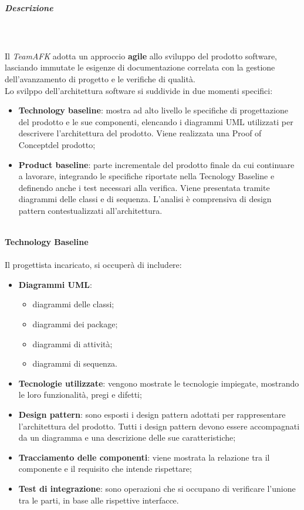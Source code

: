 		\subparagraph{Descrizione} \mbox{} \\ \mbox{} \\
		Il \textit{TeamAFK} adotta un approccio \textbf{agile} allo sviluppo del prodotto software, lasciando immutate le esigenze di documentazione correlata con la gestione dell'avanzamento di progetto e le verifiche di qualità. \\
		Lo svilppo dell'architettura software si suddivide in due momenti specifici:
			\begin{itemize}
				\item \textbf{Technology baseline}: mostra ad alto livello le specifiche di progettazione del prodotto e le sue componenti, elencando i diagrammi UML utilizzati per descrivere l'architettura del prodotto. Viene realizzata una Proof of Concept\glo del prodotto;
				\item \textbf{Product baseline}: parte incrementale del prodotto finale da cui continuare a lavorare, integrando le specifiche riportate nella Tecnology Baseline e definendo anche i test necessari alla verifica. Viene presentata tramite diagrammi delle classi e di sequenza. L'analisi è comprensiva di design pattern contestualizzati all'architettura.
			\end{itemize} 
			\mbox{} \\
			\textbf{Technology Baseline} \mbox{} \\ \mbox{} \\
			Il progettista incaricato, si occuperà di includere:
			\begin{itemize}
				\item \textbf{Diagrammi UML}:
				\begin{itemize}
					\item diagrammi delle classi;
					\item diagrammi dei package;
					\item diagrammi di attività;
					\item diagrammi di sequenza.
				\end{itemize}
				\item \textbf{Tecnologie utilizzate}: vengono mostrate le tecnologie impiegate, mostrando le loro funzionalità, pregi e difetti;
				\item \textbf{Design pattern}\glo : sono esposti i design pattern adottati per rappresentare l'architettura del prodotto. Tutti i design pattern devono essere accompagnati da un diagramma e una descrizione delle sue caratteristiche;
				\item \textbf{Tracciamento delle componenti}: viene mostrata la relazione tra il componente e il requisito che intende rispettare; 
				\item \textbf{Test di integrazione}: sono operazioni che si occupano di verificare l'unione tra le parti, in base alle rispettive interfacce.
			\end{itemize}
